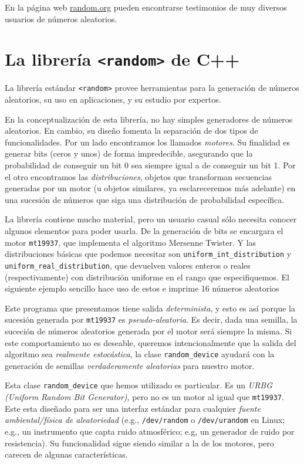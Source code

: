 \documentclass{article}
\begin{document}
En la página web \url{random.org} pueden encontrarse testimonios de muy diversos usuarios de números aleatorios.

\section{La librería \texttt{<random>} de C++}
La librería estándar \verb#<random># provee herramientas para la generación de números aleatorios, su uso en aplicaciones, y su estudio por expertos.

En la conceptualización de esta librería, no hay simples generadores de números aleatorios.
En cambio, su diseño fomenta la separación de dos tipos de funcionalidades.
Por un lado encontramos los llamados \emph{motores}.
Su finalidad es generar bits (ceros y unos) de forma impredecible, asegurando que la probabilidad de conseguir un bit 0 sea siempre igual a de conseguir un bit 1.
Por el otro encontramos las \emph{distribuciones}, objetos que transforman secuencias generadas por un motor (u objetos similares, ya esclareceremos más adelante) en una sucesión de números que siga una distribución de probabilidad específica.

La librería contiene mucho material, pero un usuario casual sólo necesita conocer algunos elementos para poder usarla.
De la generación de bits se encargara el motor \verb#mt19937#, que implementa el algoritmo Mersenne Twister.
Y las distribuciones básicas que podemos necesitar son \verb#uniform_int_distribution# y \verb#uniform_real_distribution#, que devuelven valores enteros o reales (respectivamente) con distribución uniforme en el rango que especifiquemos.
El siguiente ejemplo sencillo hace uso de estos e imprime 16 números aleatorios



Este programa que presentamos tiene salida \emph{determinista}, y esto es así porque la sucesión generada por \verb#mt19937# es \emph{pseudo-aleatoria}.
Es decir, dada una semilla, la suceción de números aleatorios generada por el motor será siempre la misma.
Si este comportamiento no es deseable, queremos intencionalmente que la salida del algoritmo sea \emph{realmente estocástica}, la clase \verb#random_device# ayudará con la generación de semillas \emph{verdaderamente aleatorias} para nuestro motor.



Esta clase \verb#random_device# que hemos utilizado es particular.
Es un \emph{URBG (Uniform Random Bit Generator)}, pero no es un motor al igual que \verb#mt19937#.
Este esta diseñado para ser una interfaz estándar para cualquier \emph{fuente ambiental/física de aleatoriedad} 
(e.g., \texttt{/dev/random} o \texttt{/dev/urandom} en Linux; 
e.g., un instrumento que capta ruido atmosférico;
e.g, un generador de ruido por resistencia).
Su funcionalidad sigue siendo similar a la de los motores, pero carecen de algunas características.
\end{document}
